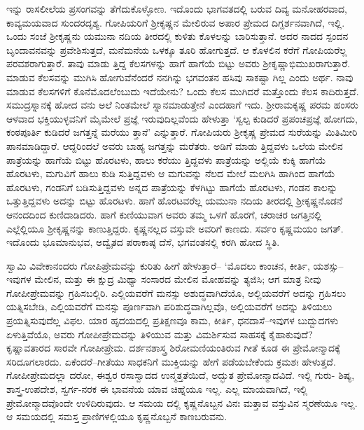 ಇನ್ನು ರಾಸಲೀಲೆಯ ಪ್ರಸಂಗವನ್ನು ತೆಗೆದುಕೊಳ್ಳೋಣ. ಇದೊಂದು ಭಾಗವತದಲ್ಲಿ ಬರುವ ದಿವ್ಯ ಮನೋಹರವಾದ, ಕಾವ್ಯಮಯವಾದ ಸುಂದರದೃಶ್ಯ. ಗೋಪಿಯರಿಗೆ ಶ್ರೀಕೃಷ್ಣನ ಮೇಲಿರುವ ಅಪಾರ ಪ್ರೇಮದ ದಿಗ್ದರ್ಶನವಾಗಿದೆ, ಇಲ್ಲಿ. ಒಂದು ಸಂಜೆ ಶ್ರೀಕೃಷ್ಣನು ಯಮುನಾ ನದಿಯ ತೀರದಲ್ಲಿ ಕುಳಿತು ಕೊಳಲನ್ನು ಬಾರಿಸುತ್ತಾನೆ. ಅದರ ನಾದದ ಸ್ಪಂದನ ಬೃಂದಾವನವನ್ನು ಪ್ರವೇಶಿಸುತ್ತದೆ, ಮನೆಮನೆಯ ಒಳಕ್ಕೂ ತೂರಿ ಹೋಗುತ್ತದೆ. ಆ ಕೊಳಲಿನ ಕರೆಗೆ ಗೋಪಿಯರೆಲ್ಲ ಪರವಶರಾಗುತ್ತಾರೆ. ತಾವು ಮಾಡು ತ್ತಿದ್ದ ಕೆಲಸಗಳನ್ನು ಹಾಗೆ ಹಾಗೆಯೆ ಬಿಟ್ಟು ಅವರು ಶ್ರೀಕೃಷ್ಣಾಭಿಮುಖರಾಗುತ್ತಾರೆ. ಮಾಡುವ ಕೆಲಸವನ್ನು ಮುಗಿಸಿ ಹೋಗುವೆನೆಂದರೆ ನನಗಿನ್ನು ಭಗವಂತನ ಹಸಿವು ಸಾಕಷ್ಟಾ ಗಿಲ್ಲ ಎಂದು ಅರ್ಥ. ನಾವು ಮಾಡುವ ಕೆಲಸಗಳಿಗೆ ಕೊನೆಮೊದಲೆಂಬುದು ಇದೆಯೇನು? ಒಂದು ಕೆಲಸ ಮುಗಿದರೆ ಮತ್ತೊಂದು ಕೆಲಸ ಕಾದಿರುತ್ತದೆ. ಸಮುದ್ರಸ್ನಾನಕ್ಕೆ ಹೋದ ವನು ಅಲೆ ನಿಂತಮೇಲೆ ಸ್ನಾನಮಾಡುತ್ತೇನೆ ಎಂದಹಾಗೆ ಇದು. ಶ್ರೀರಾಮಕೃಷ್ಣ ಪರಮ ಹಂಸರು ಆಳವಾದ ಭಕ್ತಿಯುಳ್ಳವನಿಗೆ ಮೈಮೇಲೆ ಪ್ರಜ್ಞೆ ಇರುವುದಿಲ್ಲವೆಂದು ಹೇಳುತ್ತಾ ‘ಸ್ವಲ್ಪ ಕುಡಿದರೆ ಪ್ರಪಂಚಪ್ರಜ್ಞೆ ಹೋಗದು, ಕಂಠಪೂರ್ತಿ ಕುಡಿದರೆ ಜಗತ್ತನ್ನೆ ಮರೆಯು ತ್ತಾನೆ’ ಎನ್ನುತ್ತಾರೆ. ಗೋಪಿಯರು ಶ್ರೀಕೃಷ್ಣ ಪ್ರೇಮದ ಸುರೆಯನ್ನು ಮಿತಿಮೀರಿ ಪಾನಮಾಡಿದ್ದಾರೆ. ಆದ್ದರಿಂದಲೆ ಅವರು ಬಾಹ್ಯ ಜಗತ್ತನ್ನು ಮರೆತರು. ಅಡಿಗೆ ಮಾಡು ತ್ತಿದ್ದವಳು ಒಲೆಯ ಮೇಲಿನ ಪಾತ್ರೆಯನ್ನು ಹಾಗೆಯೆ ಬಿಟ್ಟು ಹೊರಟಳು, ಹಾಲು ಕರೆಯು ತ್ತಿದ್ದವಳು ಪಾತ್ರೆಯನ್ನು ಅಲ್ಲಿಯೆ ಕುಕ್ಕಿ ಹಾಗೆಯೆ ಹೊರಟಳು, ಮಗುವಿಗೆ ಹಾಲು ಕುಡಿ ಸುತ್ತಿದ್ದವಳು ಆ ಮಗುವನ್ನು ನೆಲದ ಮೇಲೆ ಮಲಗಿಸಿ ಹಾಗಿಂದ ಹಾಗೆಯೆ ಹೊರಟಳು, ಗಂಡನಿಗೆ ಬಡಿಸುತ್ತಿದ್ದವಳು ಅನ್ನದ ಪಾತ್ರೆಯನ್ನು ಕೆಳಗಿಟ್ಟು ಹಾಗೆಯೆ ಹೊರಟಳು, ಗಂಡನ ಕಾಲನ್ನು ಒತ್ತುತ್ತಿದ್ದವಳು ಅದನ್ನು ಬಿಟ್ಟು ಹೊರಟಳು. ಹಾಗೆ ಹೊರಟವರೆಲ್ಲ ಯಮುನಾ ನದಿಯ ತೀರದಲ್ಲಿ ಶ್ರೀಕೃಷ್ಣನೊಡನೆ ಆನಂದದಿಂದ ಕುಣಿದಾಡಿದರು. ಹಾಗೆ ಕುಣಿಯುವಾಗ ಅವರು ತಮ್ಮ ಒಳಗೆ ಹೊರಗೆ, ಚರಾಚರ ಜಗತ್ತಿನಲ್ಲಿ ಎಲ್ಲೆಲ್ಲಿಯೂ ಶ್ರೀಕೃಷ್ಣನನ್ನು ಕಾಣುತ್ತಿದ್ದರು. ಕೃಷ್ಣನಲ್ಲದ ವಸ್ತುವೇ ಅವರಿಗೆ ಕಾಣದು. ಸರ್ವಂ ಕೃಷ್ಣಮಯಂ ಜಗತ್. ಇದೊಂದು ಭೂಮಾನುಭವ, ಅದ್ವೈತದ ಪರಾಕಾಷ್ಠ ದೆಸೆ, ಭಗವಂತನಲ್ಲಿ ಕರಗಿ ಹೋದ ಸ್ಥಿತಿ.

ಸ್ವಾಮಿ ವಿವೇಕಾನಂದರು ಗೋಪಿಪ್ರೇಮವನ್ನು ಕುರಿತು ಹೀಗೆ ಹೇಳುತ್ತಾರೆ– ‘ಮೊದಲು ಕಾಂಚನ, ಕೀರ್ತಿ, ಯಶಸ್ಸು–ಇವುಗಳ ಮೇಲಿನ, ಮತ್ತು ಈ ಕ್ಷುದ್ರ ಮಿಥ್ಯಾ ಸಂಸಾರದ ಮೇಲಿನ ಮೋಹವನ್ನು ತ್ಯಜಿಸಿ; ಆಗ ಮಾತ್ರ ನೀವು ಗೋಪೀಪ್ರೇಮವನ್ನು ಗ್ರಹಿಸಬಲ್ಲಿರಿ. ಎಲ್ಲಿಯವರೆಗೆ ಮನಸ್ಸು ಅಶುದ್ಧವಾಗಿದೆಯೊ, ಅಲ್ಲಿಯವರೆಗೆ ಅದನ್ನು ಗ್ರಹಿಸಲು ಯತ್ನಿಸಬೇಡಿ, ಎಲ್ಲಿಯವರೆಗೆ ಮನಸ್ಸು ಪೂರ್ಣವಾಗಿ ಪರಿಶುದ್ಧವಾಗಿಲ್ಲವೊ, ಅಲ್ಲಿಯವರೆಗೆ ಅದನ್ನು ತಿಳಿಯಲು ಪ್ರಯತ್ನಿಸುವುದೆಲ್ಲ ವಿಫಲ. ಯಾರ ಹೃದಯದಲ್ಲಿ ಪ್ರತಿಕ್ಷಣವೂ ಕಾಮ, ಕೀರ್ತಿ, ಧನದಾಸೆ–ಇವುಗಳ ಬುದ್ಬುದಗಳು ಏಳುತ್ತಿವೆಯೊ, ಅವರು ಗೋಪೀಪ್ರೇಮವನ್ನು ತಿಳಿಯುವ ಮತ್ತು ವಿಮರ್ಶಿಸುವ ಸಾಹಸಕ್ಕೆ ಕೈಹಾಕುವುದೆ? ಕೃಷ್ಣಾವತಾರದ ಸಾರವೇ ಗೋಪೀಪ್ರೇಮ. ದರ್ಶನಶಾಸ್ತ್ರ ಶಿರೋಮಣಿಯಂತಿರುವ ಗೀತೆ ಕೂಡ ಈ ಪ್ರೇಮೋನ್ಮಾದಕ್ಕೆ ಸರಿದೂಗಲಾರದು. ಏಕೆಂದರೆ–ಗೀತೆಯು ಸಾಧಕನಿಗೆ ಮುಕ್ತಿಯನ್ನು ಹೇಗೆ ಪಡೆಯಬೇಕೆಂದು ಕ್ರಮಶಃ ಹೇಳುತ್ತದೆ. ಗೋಪೀಪ್ರೇಮದಲ್ಲಾ ದರೋ, ಈಶ್ವರ ರಸಾಸ್ವಾದದ ಉನ್ಮತ್ತತೆಯಿದೆ, ಅದ್ಭುತ ಪ್ರೇಮೋನ್ಮಾದವಿದೆ. ಇಲ್ಲಿ ಗುರು- ಶಿಷ್ಯ, ಶಾಸ್ತ್ರ-ಉಪದೇಶ, ಸ್ವರ್ಗ-ನರಕ ಈ ಭಾವನೆಯ ಯಾವ ಚಿಹ್ನೆಯೂ ಇಲ್ಲ. ಎಲ್ಲ ಮಾಯವಾಗಿದೆ, ಇಲ್ಲಿ ಪ್ರೇಮೋನ್ಮಾದವೊಂದೇ ಉಳಿದಿರುವುದು. ಆ ಸಮಯ ದಲ್ಲಿ ಕೃಷ್ಣನೊಬ್ಬನ ವಿನಃ ಮತ್ತಾವ ವಸ್ತುವಿನ ಸ್ಮರಣೆಯೂ ಇಲ್ಲ. ಆ ಸಮಯದಲ್ಲಿ ಸಮಸ್ತ ಪ್ರಾಣಿಗಳಲ್ಲಿಯೂ ಕೃಷ್ಣನೊಬ್ಬನೆ ಕಾಣಬರುವನು.

